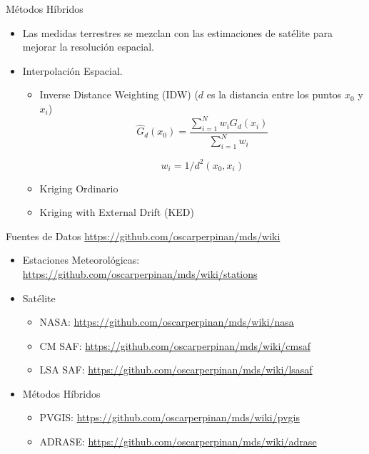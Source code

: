 \documentclass[xcolor={usenames,svgnames,dvipsnames}]{beamer}
\begin{document}
\begin{frame}[label={sec:org489f768}]{Métodos Híbridos}
\begin{itemize}
\item Las medidas terrestres se mezclan con las estimaciones de satélite para mejorar la resolución espacial.
\item Interpolación Espacial.
\begin{itemize}
\item \alert{Inverse Distance Weighting (IDW)} (\(d\) es la distancia entre los puntos \(x_0\) y  \(x_i\))
\[
\widehat{G}_d(x_0) = \frac{\sum_{i=1}^N w_i G_{d}(x_i)}{\sum_{i=1}^N w_i} 
\]

\[
  w_i = 1/d^2(x_0, x_i)
\]
\item \alert{Kriging Ordinario}
\item \alert{Kriging with External Drift (KED)}
\end{itemize}
\end{itemize}
\end{frame}

\begin{frame}[label={sec:orgd165912}]{Fuentes de Datos}
\url{https://github.com/oscarperpinan/mds/wiki}

\begin{itemize}
\item Estaciones Meteorológicas: \url{https://github.com/oscarperpinan/mds/wiki/stations}
\item Satélite
\begin{itemize}
\item NASA: \url{https://github.com/oscarperpinan/mds/wiki/nasa}
\item CM SAF: \url{https://github.com/oscarperpinan/mds/wiki/cmsaf}
\item LSA SAF: \url{https://github.com/oscarperpinan/mds/wiki/lsasaf}
\end{itemize}

\item Métodos Híbridos
\begin{itemize}
\item PVGIS: \url{https://github.com/oscarperpinan/mds/wiki/pvgis}
\item ADRASE: \url{https://github.com/oscarperpinan/mds/wiki/adrase}
\end{itemize}
\end{itemize}
\end{frame}
\end{document}
